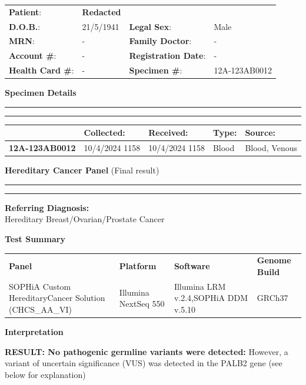 \documentclass[10pt,letterpaper]{extarticle}
\newcommand{\doublerule}{\rule{\textwidth}{1pt}

\vspace{-2em}%
\rule{\textwidth}{1pt}}
\begin{document}
\colorbox[gray]{0.8}{\parbox{\textwidth}{
  \begin{tabular}{p{} p{} p{} p{}}
    {\bf Patient}: & {\Large \bf Redacted} & & \\
    {\bf D.O.B.}: & 21/5/1941 & {\bf Legal Sex}: & Male \\
    {\bf MRN}: & - & {\bf Family Doctor}: & -\\
    {\bf Account \#}: & - & {\bf Registration Date}: & -\\
    {\bf Health Card \#}: & - & {\bf Specimen \#}: & 12A-123AB0012\\
  \end{tabular}
}}

{\bf Specimen Details}\\
\doublerule

\vspace{-1em}
\begin{tabular}{ p{3.2cm} p{3.2cm} p{3.2cm} p{3.2cm} p{3.2cm} }
              & \bf Collected: & \bf Received: & \bf Type: & \bf Source: \\ \hline
\bf 12A-123AB0012 &  10/4/2024 1158 & 10/4/2024 1158 & Blood & Blood, Venous \\
\end{tabular}


{\bf Hereditary Cancer Panel} (Final result) \\
\doublerule

{\bf \large Referring Diagnosis:}\\
Hereditary Breast/Ovarian/Prostate Cancer

{\bf \large Test Summary}

\begin{tabular}{ p{} p{} p{} p{} }
\bf Panel & \bf Platform & \bf Software & \bf Genome Build \\
SOPHiA Custom Hereditary\newline Cancer Solution (CHCS\_AA\_VI) & Illumina NextSeq 550 & Illumina LRM v.2.4,\newline SOPHiA DDM v.5.10 & GRCh37\\
\end{tabular}


{\bf \large Interpretation}

{\bf RESULT: No pathogenic germline variants were detected:} However, a variant of uncertain significance (VUS) was detected in the PALB2 gene (see below for explanation)
\end{document}
